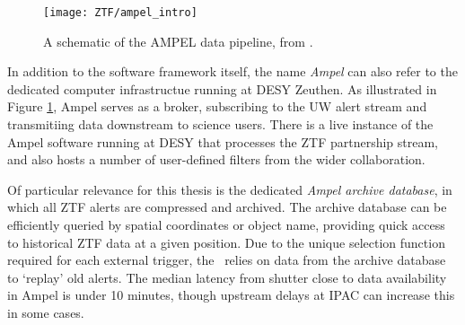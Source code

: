 \begin{figure}[!ht]
	\centering \texttt{[image: ZTF/ampel\_intro]}
	\caption{A schematic of the AMPEL data pipeline, from \cite{ampel}.}
	\label{fig:ampel_pipeline}
\end{figure}

In addition to the software framework itself, the name \emph{Ampel} can also refer to the dedicated computer infrastructue running at DESY Zeuthen. As illustrated in Figure \ref{fig:ampel_pipeline}, Ampel serves as a broker, subscribing to the UW alert stream and transmitiing data downstream to science users. There is a live instance of the Ampel software running at DESY that processes the ZTF partnership stream, and also hosts a number of user-defined filters from the wider collaboration. 

Of particular relevance for this thesis is the dedicated \emph{Ampel archive database}, in which all ZTF alerts are compressed and archived. The archive database can be efficiently queried by spatial coordinates or object name, providing quick access to historical ZTF data at a given position. Due to the unique selection function required for each external trigger, the \ztf ~relies on data from the archive database to `replay' old alerts. The median latency from shutter close to data availability in Ampel is under 10 minutes, though upstream delays at IPAC can increase this in some cases.
